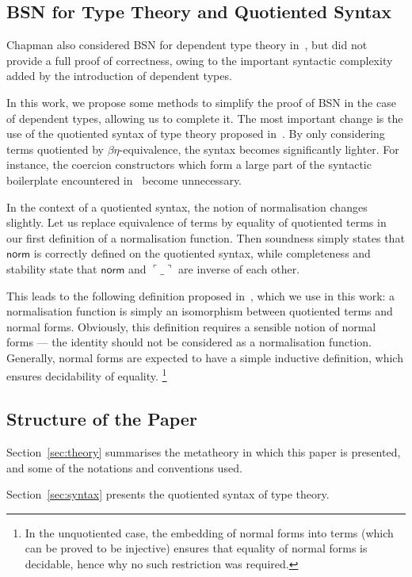 \documentclass[a4paper,english]{lipics-v2019}
\newcommand{\agdaSymb}[1]{\mathsf{#1}}
\newcommand{\norm}{\agdaSymb{norm}}
\newcommand{\cul}{\ulcorner}
\newcommand{\cur}{\urcorner}
\begin{document}
\subsection{BSN for Type Theory and Quotiented Syntax}
Chapman also considered BSN for dependent type theory in~\cite{chapman2009type},
but did not provide a full proof of correctness, owing to the important
syntactic complexity added by the introduction of dependent types.

In this work, we propose some methods to simplify the proof of BSN in the case
of dependent types, allowing us to complete it.
The most important change is the use of the quotiented syntax of type theory
proposed in~\cite{kaposi2016type}. By only considering terms quotiented by
$\beta\eta$-equivalence, the syntax becomes significantly lighter. For instance,
the coercion constructors which form a large part of the syntactic boilerplate
encountered in~\cite{chapman2009type} become unnecessary.

In the context of a quotiented syntax, the notion of normalisation changes
slightly. Let us replace equivalence of terms by equality of quotiented terms
in our first definition of a normalisation function. Then soundness simply
states that $\norm$ is correctly defined on the quotiented syntax, while
completeness and stability state that $\norm$ and $\cul\_\cur$ are inverse of
each other.

This leads to the following definition proposed in~\cite{kaposi2016normalisation},
which we use in this work: a normalisation function is simply an isomorphism
between quotiented terms and normal forms. Obviously, this definition requires
a sensible notion of normal forms --- the identity should not be considered as
a normalisation function. Generally, normal forms are expected to have a simple
inductive definition, which ensures decidability of equality.%
\footnote{%
  In the unquotiented case, the embedding of normal forms into terms (which can
  be proved to be injective) ensures that equality of normal forms is decidable,
  hence why no such restriction was required.
}

\subsection{Structure of the Paper}
Section~\ref{sec:theory} summarises the metatheory in which this paper is
presented, and some of the notations and conventions used.

Section~\ref{sec:syntax} presents the quotiented syntax of type theory.
\end{document}
